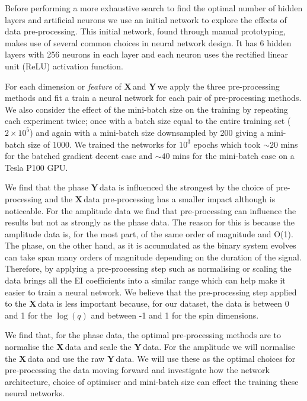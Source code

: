 \documentclass[aps,prd,reprint,superscriptaddress,preprintnumbers,showpacs,nofootinbib]{revtex4-1}
\newcommand{\X}{$\mathbf{X}\,$}
\newcommand{\Y}{$\mathbf{Y}\,$}
\begin{document}
Before performing a more exhaustive search to find the optimal number of hidden
layers and artificial neurons we use an initial network to explore the effects
of data pre-processing. This initial network, found through manual prototyping,
makes use of several common choices in neural network design. It has 6 hidden
layers with 256 neurons in each layer and each neuron uses the rectified linear
unit (ReLU) activation function.

For each dimension or \emph{feature} of \X and \Y we apply the three
pre-processing methods and fit a train a neural network for each pair of
pre-processing methods. We also consider the effect of the mini-batch size on
the training by repeating each experiment twice; once with a batch size equal to
the entire training set ($2 \times 10^{5}$) and again with a mini-batch size
downsampled by 200 giving a mini-batch size of $1000$. We trained the networks
for $10^{3}$ epochs which took $\sim 20$ mins for the batched gradient decent
case and $\sim 40$ mins for the mini-batch case on a Tesla P100 GPU.

We find that the phase \Y data is influenced the strongest by the choice of
pre-processing and the \X data pre-processing has a smaller impact although
is noticeable.
For the amplitude data we find that pre-processing can influence
the results but not as strongly as the phase data.
The reason for this is because the amplitude data is, for the most part,
of the same order of magnitude and O(1). The phase, on the other hand,
as it is accumulated as the binary system evolves can take span
many orders of magnitude depending on the duration of the signal.
Therefore, by applying a pre-processing step such as normalising or scaling
the data brings all the EI coefficients into a similar range which
can help make it easier to train a neural network.
We believe that the pre-processing step applied to the \X data is
less important because, for our dataset, the data is between 0 and 1 for the
$\log(q)$ and between -1 and 1 for the spin dimensions.

We find that, for the phase data, the optimal pre-processing methods are to
normalise the \X data and scale the \Y data. For the amplitude we will
normalise the \X data and use the raw \Y data. We will use these as the
optimal choices for pre-processing the data moving forward and investigate how
the network architecture, choice of optimiser and mini-batch size can effect the
training these neural networks.
\end{document}
